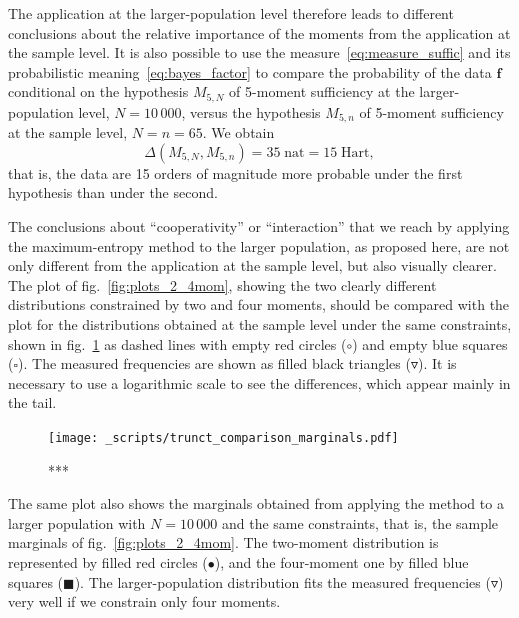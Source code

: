 \documentclass[\ifafour a4paper,12pt,\else a5paper,10pt,\fi%
onecolumn,oneside,article,%
british%
]{memoir}
\theoremstyle{remark}
\theoremstyle{innote}
\renewcommand*{\|}{\nonscript\,\vert\nonscript\;\mathopen{}}
\newcommand*{\fig}{fig.}%
\newcommand*{\yff}{f}
\newcommand*{\yf}{\bm{\yff}}
\newcommand*{\ydi}{\varDelta}
\newcommand*{\nat}{\textrm{nat}}
\newcommand*{\hart}{\textrm{Hart}}
\begin{document}
The application at the larger-population level therefore leads to different
conclusions about the relative importance of the moments from the
application at the sample level. It is also possible to use the
measure~\eqref{eq:measure_suffic} and its probabilistic
meaning~\eqref{eq:bayes_factor} to compare the probability of the data
$\yf$ conditional on the hypothesis $M_{5, N}$ of 5-moment sufficiency at
the larger-population level, $N=10\,000$, versus the hypothesis $M_{5, n}$ of
5-moment sufficiency at the sample level, $N=n=65$. We obtain
\begin{equation}
  \label{eq:diff_suff_n}
  \ydi(M_{5, N}, M_{5, n}) = 35\;\nat = 15\;\hart,
\end{equation}
that is, the data are 15 orders of magnitude more probable under the first
hypothesis than under the second.

\bigskip

The conclusions about \enquote{cooperativity} or \enquote{interaction}
that we reach by applying the maximum-entropy method to the larger population,
as proposed here, are not only different from the application at the sample
level, but also visually clearer. The plot of \fig~\ref{fig:plots_2_4mom},
showing the two clearly different distributions constrained by two and four
moments, should be compared with the plot for the distributions obtained at
the sample level under the same constraints, shown in
\fig~\ref{fig:comparisons_marginals} as dashed lines with empty red
circles (\textcolor{myred}{\LARGE$\bm{\mathord{\circ}}$}) and empty blue
squares (\textcolor{mypurpleblue}{$\bm{\square}$}). The measured
frequencies are shown as filled black triangles
(\textcolor{black}{$\bm{\triangledown}$}). It is necessary to use a
logarithmic scale to see the differences, which appear mainly in the tail.
\begin{figure}[!b]
\centering
\texttt{[image: \_scripts/trunct\_comparison\_marginals.pdf]}%
\caption{***}
\label{fig:comparisons_marginals}
\end{figure}

The same plot also shows the marginals obtained from applying the method to
a larger population with $N=10\,000$ and the same constraints, that is, the
sample marginals of \fig~\ref{fig:plots_2_4mom}. The two-moment
distribution is represented by filled red circles
(\textcolor{myred}{\LARGE$\bm{\bullet}$}), and the four-moment one by
filled blue squares (\textcolor{mypurpleblue}{$\bm{\blacksquare}$}). The
larger-population distribution fits the measured frequencies
(\textcolor{black}{$\bm{\triangledown}$}) very well if we constrain only four
moments.
\end{document}
